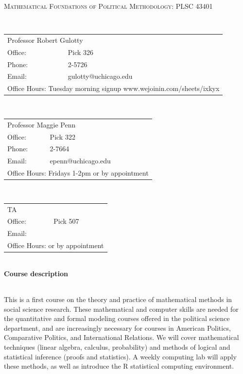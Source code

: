 \documentclass[11pt]{article}
\begin{document}
\begin{center}

\large
\textsc{Mathematical Foundations of Political Methodology: PLSC 43401}\\
\end{center}

\small

\ \\ \begin{tabular} {ll} \multicolumn{2}{l}{Professor Robert Gulotty}\\
Office: &Pick 326\\
Phone: &2-5726\\
Email: &gulotty@uchicago.edu\\
\multicolumn{2}{l}{Office Hours: Tuesday morning signup www.wejoinin.com/sheets/ixkyx}
\end{tabular}

\vspace{.15in}

\ \\ \begin{tabular} {ll} \multicolumn{2}{l}{Professor Maggie Penn}\\
Office: &Pick 322\\
Phone: &2-7664\\
Email: &epenn@uchicago.edu\\
\multicolumn{2}{l}{Office Hours: Fridays 1-2pm or by appointment}
\end{tabular}

\vspace{.15in}

\ \\ \begin{tabular} {ll} \multicolumn{2}{l}{TA }\\
Office: & Pick 507\\
Email: &  \\
\multicolumn{2}{l}{Office Hours: or by appointment }
\end{tabular}

\vspace{.5in}

\ \\{\bf Course description}  

\ \\This is a first course on the theory and practice of mathematical methods in social science research.  These mathematical and computer skills are needed for the quantitative and formal modeling courses offered in the political science department, and are increasingly necessary for courses in American Politics, Comparative Politics, and International Relations.   We will cover mathematical techniques (linear algebra, calculus, probability) and methods of logical and statistical inference (proofs and statistics).  A weekly computing lab will apply these methods, as well as introduce the R statistical computing environment.
\end{document}

